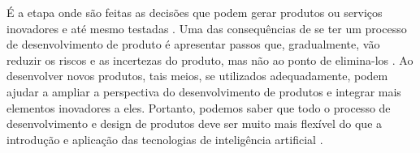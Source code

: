 É a etapa onde são feitas as decisões que podem gerar produtos ou serviços inovadores e até mesmo testadas \cite{verganti2020innovation}. Uma das consequências de se ter um processo de desenvolvimento de produto é apresentar passos que, gradualmente, vão reduzir os riscos e as incertezas do produto, mas não ao ponto de elimina-los \cite{baxter2018product}. Ao desenvolver novos produtos, tais meios, se utilizados adequadamente, podem ajudar a ampliar a perspectiva do desenvolvimento de produtos e integrar mais elementos inovadores a eles. Portanto, podemos saber que todo o processo de desenvolvimento e design de produtos deve ser muito mais flexível do que a introdução e aplicação das tecnologias de inteligência artificial \cite{li_development_2021}.